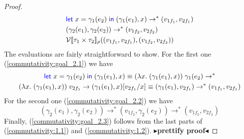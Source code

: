 \documentclass[twoside,11pt,openright]{report}
\theoremstyle{definition}
\newcommand{\var}{x}
\newcommand{\expr}{e}
\newcommand{\val}{v}
\newcommand{\subst}[3]{#1{\left[#3 \middle/ #2 \right]}}
\newcommand{\Tprod}[2]{#1 \times #2}
\newcommand{\typ}{\tau}
\newcommand{\step}{\rightarrow}
\newcommand{\stepS}{\rightarrow^*}
\newcommand{\ValInp}[2]{\mathcal{V} \llbracket #1 \rrbracket_{#2}}
\newcommand{\todo}[1]{{\color[rgb]{.5,0,0}\textbf{$\blacktriangleright$#1$\blacktriangleleft$}}}
\begin{document}
\begin{proof}
  \begin{align}
    &\Let \var = \gamma_1(\expr_2) in (\gamma_1(\expr_1), \var) \stepS (\val_{1f_1}, \val_{2f_1})\label{commutativity:goal_2.1}\\
    &(\gamma_2(\expr_1), \gamma_2(\expr_2)) \stepS (\val_{1f_2}, \val_{2f_2})\label{commutativity:goal_2.2}\\
    &\ValInp{\Tprod{\typ_1}{\typ_2}}{\rho}((\val_{1f_1}, \val_{2f_1}), (\val_{1f_2}, \val_{2f_2}))\label{commutativity:goal_2.3}
  \end{align}
  The evaluations are fairly straightforward to show. For the first one (\ref*{commutativity:goal_2.1}) we have
  \begin{multline*}
    \Let \var = \gamma_1(\expr_2) in (\gamma_1(\expr_1), \var) \equiv (\fun \var . (\gamma_1(\expr_1), \var)) \; \gamma_1(\expr_2) \stepS\\ (\fun \var . (\gamma_1(\expr_1), \var)) \; \val_{2f_1} \step \subst{(\gamma_1(\expr_1), \var)}{\var}{\val_{2f_1}} \equiv (\gamma_1(\expr_1), \val_{2f_1}) \stepS (\val_{1f_1}, \val_{2f_1})
  \end{multline*}
  For the second one (\ref*{commutativity:goal_2.2}) we have
  \begin{equation*}
    (\gamma_2(\expr_1), \gamma_2(\expr_2)) \stepS (\val_{1f_2}, \gamma_2(\expr_2)) \stepS (\val_{1f_2}, \val_{2f_2})
  \end{equation*}
  Finally, (\ref*{commutativity:goal_2.3}) follows from the last parts of (\ref*{commutativity:1.1}) and (\ref*{commutativity:1.2}).
  \todo{prettify proof}
\end{proof}
\end{document}
